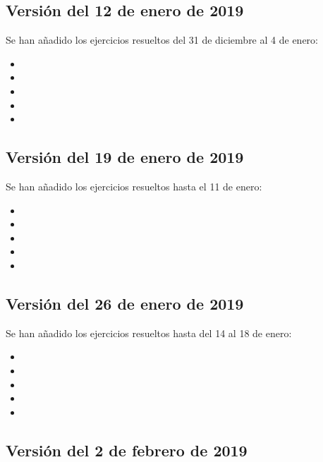 \documentclass[a4paper,12pt,twoside]{book}
\begin{document}
\subsection*{Versión del 12 de enero de 2019}

Se han añadido los ejercicios resueltos del 31 de diciembre al 4 de
enero: 

\begin{itemize}
\item {}
\item {}
\item {}
\item {}
\item {}
\end{itemize}

\subsection*{Versión del 19 de enero de 2019}

Se han añadido los ejercicios resueltos hasta el 11 de enero:

\begin{itemize}
\item {}
\item {}
\item {}
\item {}
\item {}
\end{itemize}

\subsection*{Versión del 26 de enero de 2019}

Se han añadido los ejercicios resueltos hasta del 14 al 18 de enero:

\begin{itemize}
\item {}
\item {}
\item {}
\item {}
\item {}
\end{itemize}

\subsection*{Versión del 2 de febrero de 2019}
\end{document}
